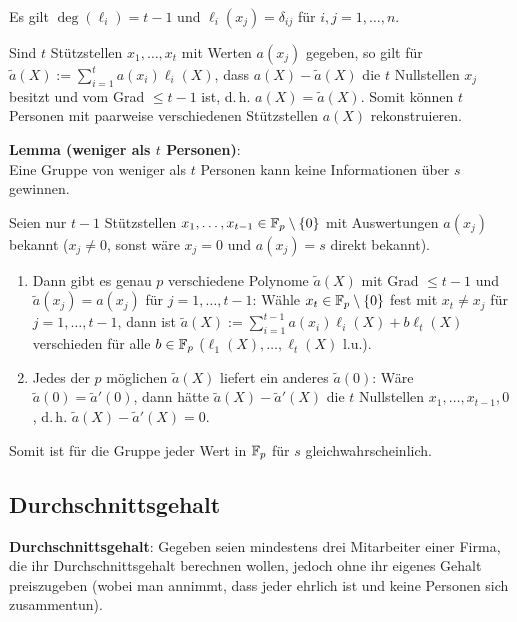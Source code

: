 Es gilt $\deg(\ell_i) = t - 1$ und $\ell_i(x_j) = \delta_{ij}$ für $i, j = 1, \dotsc, n$.

Sind $t$ Stützstellen $x_1, \dotsc, x_t$ mit Werten $a(x_j)$ gegeben, so gilt
für $\widetilde{a}(X) := \sum_{i=1}^t a(x_i) \ell_i(X)$,
dass $a(X) - \widetilde{a}(X)$ die $t$ Nullstellen $x_j$ besitzt und
vom Grad $\le t - 1$ ist, d.\,h. $a(X) = \widetilde{a}(X)$.
Somit können $t$ Personen mit paarweise verschiedenen Stützstellen $a(X)$ rekonstruieren.

\textbf{Lemma (weniger als $t$ Personen)}:\\
Eine Gruppe von weniger als $t$ Personen kann keine Informationen über $s$ gewinnen.

\begin{Beweis}
    Seien nur $t - 1$ Stützstellen $x_1, \dotsc, x_{t-1} \in \mathbb{F}_p \setminus \{0\}$
    mit Auswertungen $a(x_j)$ bekannt
    ($x_j \not= 0$, sonst wäre $x_j = 0$ und $a(x_j) = s$ direkt bekannt).
    \begin{enumerate}
        \item
        Dann gibt es genau $p$ verschiedene Polynome $\widetilde{a}(X)$ mit Grad $\le t - 1$ und
        $\widetilde{a}(x_j) = a(x_j)$ für $j = 1, \dotsc, t - 1$:
        Wähle $x_t \in \mathbb{F}_p \setminus \{0\}$ fest mit $x_t \not= x_j$ für $j = 1, \dotsc, t-1$,
        dann ist $\widetilde{a}(X) := \sum_{i=1}^{t-1} a(x_i) \ell_i(X) + b\ell_t(X)$
        verschieden für alle $b \in \mathbb{F}_p$
        ($\ell_1(X), \dotsc, \ell_t(X)$ l.u.).
        
        \item
        Jedes der $p$ möglichen $\widetilde{a}(X)$ liefert ein anderes $\widetilde{a}(0)$:
        Wäre $\widetilde{a}(0) = \widetilde{a}'(0)$, dann hätte
        $\widetilde{a}(X) - \widetilde{a}'(X)$
        die $t$ Nullstellen $x_1, \dotsc, x_{t-1}, 0$, d.\,h.
        $\widetilde{a}(X) - \widetilde{a}'(X) = 0$.
    \end{enumerate}
    Somit ist für die Gruppe jeder Wert in $\mathbb{F}_p$ für $s$ gleichwahrscheinlich.
\end{Beweis}

\pagebreak

\subsection{%
    Durchschnittsgehalt%
}

\textbf{Durchschnittsgehalt}:
Gegeben seien mindestens drei Mitarbeiter einer Firma, die ihr Durchschnittsgehalt berechnen
wollen, jedoch ohne ihr eigenes Gehalt preiszugeben
(wobei man annimmt, dass jeder ehrlich ist und keine Personen sich zusammentun).

